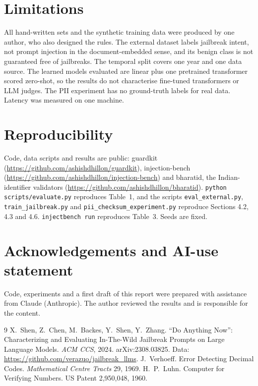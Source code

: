 \documentclass[11pt]{article}
\begin{document}
\section{Limitations}
All hand-written sets and the synthetic training data were produced by one author, who also designed the rules. The external dataset labels jailbreak intent, not prompt injection in the document-embedded sense, and its benign class is not guaranteed free of jailbreaks. The temporal split covers one year and one data source. The learned models evaluated are linear plus one pretrained transformer scored zero-shot, so the results do not characterise fine-tuned transformers or LLM judges. The PII experiment has no ground-truth labels for real data. Latency was measured on one machine.

\section{Reproducibility}
Code, data scripts and results are public: guardkit (\url{https://github.com/ashishdhillon/guardkit}), injection-bench (\url{https://github.com/ashishdhillon/injection-bench}) and bharatid, the Indian-identifier validators (\url{https://github.com/ashishdhillon/bharatid}). \texttt{python scripts/evaluate.py} reproduces Table~1, and the scripts \texttt{eval\_external.py}, \texttt{train\_jailbreak.py} and \texttt{pii\_checksum\_experiment.py} reproduce Sections 4.2, 4.3 and 4.6. \texttt{injectbench run} reproduces Table~3. Seeds are fixed.

\section*{Acknowledgements and AI-use statement}
Code, experiments and a first draft of this report were prepared with assistance from Claude (Anthropic). The author reviewed the results and is responsible for the content.

\begin{thebibliography}{9}
 X.~Shen, Z.~Chen, M.~Backes, Y.~Shen, Y.~Zhang. ``Do Anything Now'': Characterizing and Evaluating In-The-Wild Jailbreak Prompts on Large Language Models. \emph{ACM CCS}, 2024. arXiv:2308.03825. Data: \url{https://github.com/verazuo/jailbreak_llms}.
 J.~Verhoeff. Error Detecting Decimal Codes. \emph{Mathematical Centre Tracts} 29, 1969.
 H.~P.~Luhn. Computer for Verifying Numbers. US Patent 2,950,048, 1960.
\end{thebibliography}
\end{document}
